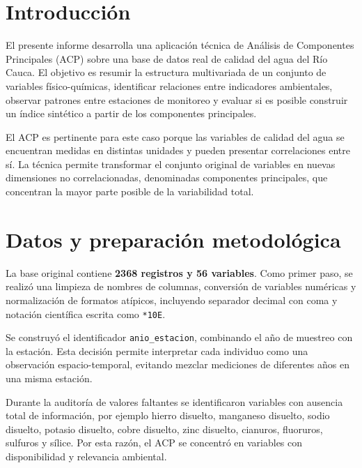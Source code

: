 \documentclass[12pt,letterpaper]{article}
\begin{document}
\section{Introducción}

El presente informe desarrolla una aplicación técnica de Análisis de Componentes Principales (ACP) sobre una base de datos real de calidad del agua del Río Cauca. El objetivo es resumir la estructura multivariada de un conjunto de variables físico-químicas, identificar relaciones entre indicadores ambientales, observar patrones entre estaciones de monitoreo y evaluar si es posible construir un índice sintético a partir de los componentes principales.

El ACP es pertinente para este caso porque las variables de calidad del agua se encuentran medidas en distintas unidades y pueden presentar correlaciones entre sí. La técnica permite transformar el conjunto original de variables en nuevas dimensiones no correlacionadas, denominadas componentes principales, que concentran la mayor parte posible de la variabilidad total.

\section{Datos y preparación metodológica}

La base original contiene \textbf{2368 registros y 56 variables}. Como primer paso, se realizó una limpieza de nombres de columnas, conversión de variables numéricas y normalización de formatos atípicos, incluyendo separador decimal con coma y notación científica escrita como \texttt{*10E}.

Se construyó el identificador \texttt{anio\_estacion}, combinando el año de muestreo con la estación. Esta decisión permite interpretar cada individuo como una observación espacio-temporal, evitando mezclar mediciones de diferentes años en una misma estación.

Durante la auditoría de valores faltantes se identificaron variables con ausencia total de información, por ejemplo hierro disuelto, manganeso disuelto, sodio disuelto, potasio disuelto, cobre disuelto, zinc disuelto, cianuros, fluoruros, sulfuros y sílice. Por esta razón, el ACP se concentró en variables con disponibilidad y relevancia ambiental.
\end{document}
